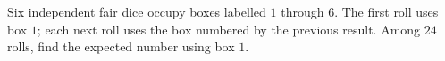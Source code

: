 Six independent fair dice occupy boxes labelled $1$ through $6$. The first roll uses box $1$; each next roll uses the box numbered by the previous result. Among $24$ rolls, find the expected number using box $1$.
